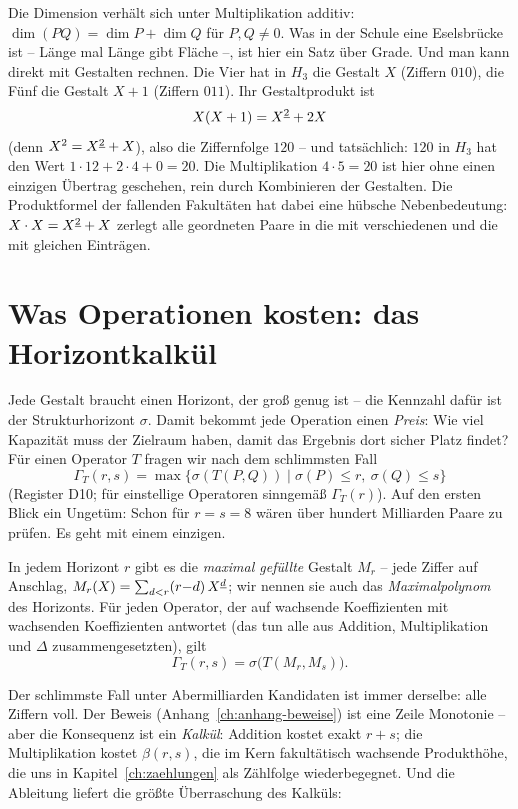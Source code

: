 Die Dimension verhält sich unter Multiplikation additiv:
$\dim(PQ)=\dim P+\dim Q$ für $P,Q\ne0$. Was in der Schule eine Eselsbrücke ist --
Länge mal Länge gibt Fläche --, ist hier ein Satz über Grade. Und
man kann direkt mit Gestalten rechnen. Die Vier hat in $H_3$ die
Gestalt $X$ (Ziffern $010$), die Fünf die Gestalt $X+1$ (Ziffern
$011$). Ihr Gestaltprodukt ist
\[
X(X+1)=X^{\underline{2}}+2X
\]
(denn $X^2=X^{\underline{2}}+X$), also die Ziffernfolge $120$ -- und
tatsächlich: $120$ in $H_3$ hat den Wert $1\cdot12+2\cdot4+0=20$.
Die Multiplikation $4\cdot5=20$ ist hier ohne einen einzigen
Übertrag geschehen, rein durch Kombinieren der Gestalten. Die
Produktformel der fallenden Fakultäten hat dabei eine hübsche
Nebenbedeutung: $X\cdot X=X^{\underline{2}}+X$ zerlegt alle geordneten Paare
in die mit verschiedenen und die mit gleichen Einträgen.

\section{Was Operationen kosten: das Horizontkalkül}
\label{sec:horizontkalkuel}

Jede Gestalt braucht einen Horizont, der groß genug ist -- die
Kennzahl dafür ist der Strukturhorizont $\sigma$. Damit bekommt jede
Operation einen \emph{Preis}: Wie viel Kapazität muss der Zielraum
haben, damit das Ergebnis dort sicher Platz findet? Für einen
Operator $T$ fragen wir nach dem schlimmsten Fall
\[
\Gamma_T(r,s)=\max\{\sigma(T(P,Q)) \mid \sigma(P)\le r,\ \sigma(Q)\le s\}
\]
(Register D10; für einstellige Operatoren sinngemäß $\Gamma_T(r)$). Auf den ersten Blick ein Ungetüm: Schon für $r=s=8$
wären über hundert Milliarden Paare zu prüfen. Es geht mit einem
einzigen.

\begin{satz}
In jedem Horizont $r$ gibt es die \emph{maximal gefüllte} Gestalt
$M_r$ -- jede Ziffer auf Anschlag,
$M_r(X)=\sum_{d<r}(r{-}d)\,X^{\underline{d}}$; wir nennen sie auch das
\emph{Maximalpolynom} des Horizonts.
Für jeden Operator, der auf wachsende Koeffizienten mit wachsenden
Koeffizienten antwortet (das tun alle aus Addition, Multiplikation
und $\Delta$ zusammengesetzten), gilt
\[
\Gamma_T(r,s)=\sigma\bigl(T(M_r,M_s)\bigr).
\]
\end{satz}

Der schlimmste Fall unter Abermilliarden Kandidaten ist immer
derselbe: alle Ziffern voll. Der Beweis (Anhang~\ref{ch:anhang-beweise})
ist eine Zeile Monotonie -- aber die Konsequenz ist ein
\emph{Kalkül}: Addition kostet exakt $r+s$; die Multiplikation kostet
$\beta(r,s)$, die im Kern fakultätisch wachsende Produkthöhe, die uns
in Kapitel~\ref{ch:zaehlungen} als Zählfolge wiederbegegnet. Und die
Ableitung liefert die größte Überraschung des Kalküls:

